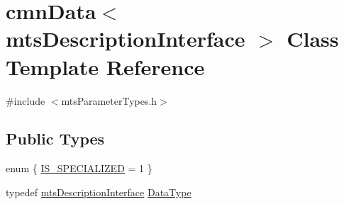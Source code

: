 \hypertarget{classcmn_data_3_01mts_description_interface_01_4}{}\section{cmn\+Data$<$ mts\+Description\+Interface $>$ Class Template Reference}
\label{classcmn_data_3_01mts_description_interface_01_4}


{\ttfamily \#include $<$mts\+Parameter\+Types.\+h$>$}

\subsection*{Public Types}
\begin{DoxyCompactItemize}
\item 
enum \{ \hyperlink{classcmn_data_3_01mts_description_interface_01_4_aee4356b5ee771ed231d7eb63c8ba6923afe05305fe82655e69f80ecd133751f94}{I\+S\+\_\+\+S\+P\+E\+C\+I\+A\+L\+I\+Z\+E\+D} = 1
 \}
\item 
typedef \hyperlink{classmts_description_interface}{mts\+Description\+Interface} \hyperlink{classcmn_data_3_01mts_description_interface_01_4_a17b736179c710a2ad3b114ef631709bb}{Data\+Type}
\end{DoxyCompactItemize}
